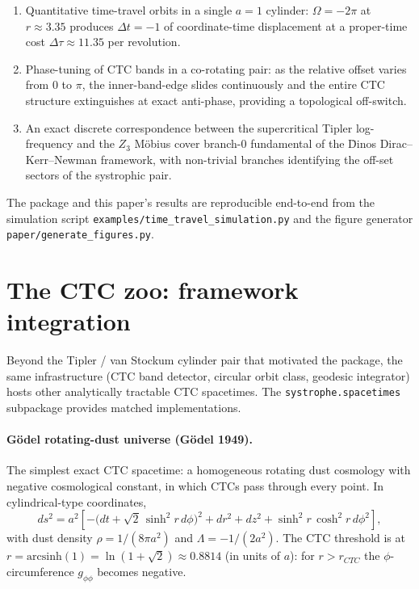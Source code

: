 \documentclass[11pt,a4paper]{article}
\begin{document}
\begin{enumerate}[leftmargin=*]
\item Quantitative time-travel orbits in a single $a = 1$ cylinder:
$\Omega = -2\pi$ at $r \approx 3.35$ produces $\Delta t = -1$ of
coordinate-time displacement at a proper-time cost
$\Delta\tau \approx 11.35$ per revolution.

\item Phase-tuning of CTC bands in a co-rotating pair: as the relative
offset varies from $0$ to $\pi$, the inner-band-edge slides
continuously and the entire CTC structure extinguishes at exact
anti-phase, providing a topological off-switch.

\item An exact discrete correspondence between the supercritical
Tipler log-frequency and the $Z_3$ M\"obius cover branch-$0$
fundamental of the \=Dinos Dirac--Kerr--Newman framework, with
non-trivial branches identifying the off-set sectors of the systrophic
pair.
\end{enumerate}

The package and this paper's results are reproducible end-to-end from
the simulation script \texttt{examples/time\_travel\_simulation.py}
and the figure generator \texttt{paper/generate\_figures.py}.

\section{The CTC zoo: framework integration}
\label{sec:zoo}

Beyond the Tipler / van Stockum cylinder pair that motivated the
package, the same infrastructure (CTC band detector, circular orbit
class, geodesic integrator) hosts other analytically tractable CTC
spacetimes. The \texttt{systrophe.spacetimes} subpackage provides
matched implementations.

\paragraph{G\"odel rotating-dust universe (G\"odel 1949).}
The simplest exact CTC spacetime: a homogeneous rotating dust cosmology
with negative cosmological constant, in which CTCs pass through every
point. In cylindrical-type coordinates,
\begin{equation}
ds^2 = a^2\!\left[ -\bigl(dt + \sqrt{2}\,\sinh^2 r\,d\phi\bigr)^2
                  + dr^2 + dz^2 + \sinh^2 r\,\cosh^2 r\,d\phi^2 \right],
\end{equation}
with dust density $\rho = 1/(8\pi a^2)$ and $\Lambda = -1/(2 a^2)$.
The CTC threshold is at $r = \mathrm{arcsinh}(1) = \ln(1 + \sqrt 2)
\approx 0.8814$ (in units of $a$): for $r > r_{CTC}$ the
$\phi$-circumference $g_{\phi\phi}$ becomes negative.
\end{document}
